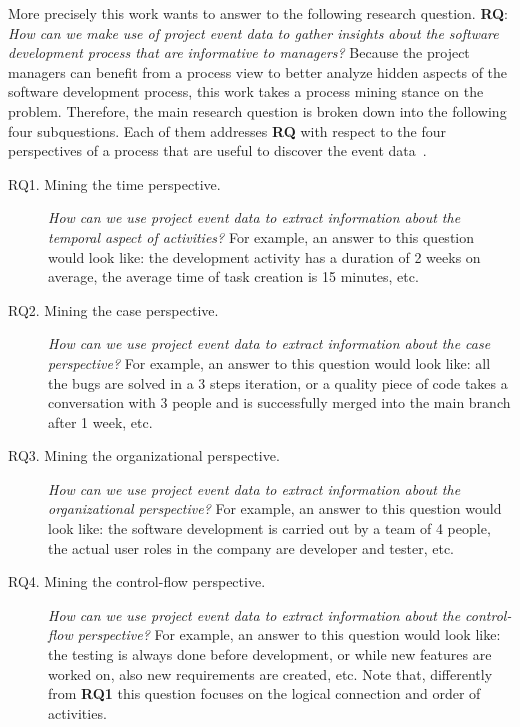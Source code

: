\documentclass[a4paper,11pt]{article}
\begin{document}
More precisely this work wants to answer to the following research question. \textbf{RQ}: \emph{How can we make use of project event data to gather insights about the software development process that are informative to managers?} 
Because the project managers can benefit from a process view to better analyze hidden aspects of the software development process, this work takes a process mining stance on the problem. Therefore, the main research question is broken down into the following four subquestions. Each of them addresses \textbf{RQ} with respect to the four perspectives of a process that are useful to discover the event data~\cite{VanderAalst2016b}.


\begin{description}
	\item[RQ1. Mining the time perspective.] \emph{How can we use project event data to extract information about the temporal aspect of activities?} For example, an answer to this question would look like: the development activity has a duration of 2 weeks on average, the average time of task creation is 15 minutes, etc. 
	
	\item[RQ2. Mining the case perspective.] \emph{How can we use project event data to extract information about the case perspective?} For example, an answer to this question would look like: all the bugs are solved in a 3 steps iteration, or a quality piece of code takes a conversation with 3 people and is successfully merged into the main branch after 1 week, etc.
	
	\item[RQ3. Mining the organizational perspective.] \emph{How can we use project event data to extract information about the organizational perspective?} For example, an answer to this question would look like: the software development is carried out by a team of 4 people, the actual user roles in the company are developer and tester, etc.
	
	\item[RQ4. Mining the control-flow perspective.] \emph{How can we use project event data to extract information about the control-flow perspective?} For example, an answer to this question would look like: the testing is always done before development, or while new features are worked on, also new requirements are created, etc. Note that, differently from \textbf{RQ1} this question focuses on the logical connection and order of activities.
	
\end{description}
\end{document}
